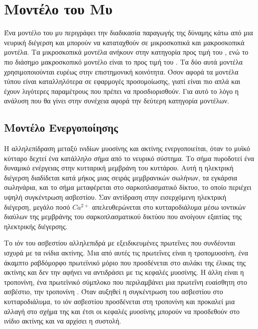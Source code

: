 \section{Μοντέλο του Μυ}

Ένα μοντέλο του μυ περιγράφει την διαδικασία παραγωγής της δύναμης κάτω από μια νευρική διέγερση και μπορούν να καταταχθούν σε μικροσκοπικά και μακροσκοπικά μοντέλα. Τα μικροσκοπικά μοντέλα ανήκουν στην κατηγορία  προς τιμή του , ενώ το πιο διάσημο μακροσκοπικό μοντέλο είναι το  προς τιμή του . Τα δύο αυτά μοντέλα χρησιμοποιούνται ευρέως στην επιστημονική κοινότητα. Όσον αφορά τα μοντέλα τύπου  είναι καταλληλότερα σε εφαρμογές προσομοίωσης, γιατί είναι πιο απλά και έχουν λιγότερες παραμέτρους που πρέπει να προσδιορισθούν. Για αυτό το λόγο η ανάλυση που θα γίνει στην συνέχεια αφορά την δεύτερη κατηγορία μοντέλων.

\subsection{Μοντέλο Ενεργοποίησης}

Η αλληλεπίδραση μεταξύ ινιδίων μυοσίνης και ακτίνης ενεργοποιείται, όταν το μυϊκό κύτταρο δεχτεί ένα κατάλληλο σήμα από το νευρικό σύστημα. Το σήμα πυροδοτεί ένα δυναμικό ενέργειας στην κυτταρική μεμβράνη του κυττάρου. Αυτή η ηλεκτρική διέγερση διαδίδεται κατά μήκος μιας σειράς μεμβρανικών σωλήνων, τα εγκάρσια σωληνάρια, και το σήμα μεταφέρεται στο σαρκοπλασματικό δίκτυο, το οποίο περιέχει υψηλή συγκέντρωση ασβεστίου. Σαν αντίδραση στην εισερχόμενη ηλεκτρική διέγερση, μεγάλο ποσό $Ca^{2+}$ απελευθερώνεται στο κυτταροδιάλυμα μέσω ιοντικών διαύλων της μεμβράνης του σαρκοπλασματικού δικτύου που ανοίγουν εξαιτίας της ηλεκτρικής διέγερσης.

Το ιόν του ασβεστίου αλληλεπιδρά με εξειδικευμένες πρωτεΐνες που συνδέονται ισχυρά με τα ινίδια ακτίνης. Μια από αυτές τις πρωτεΐνες είναι η τροπομυοσίνη, ένα άκαμπτο ραβδόμορφο πρωτεϊνικό μόριο που προσδένεται στο αυλάκι της έλικας της ακτίνης και δεν την αφήνει να αντιδράσει με τις κεφαλές μυοσίνης. Η άλλη είναι η τροπονίνη, ένα πρωτεϊνικό σύμπλοκο που περιλαμβάνει μια πρωτεΐνη ευαίσθητη στο ασβέστιο, την τροπονίνη . Όταν αυξηθεί η συγκέντρωση του ασβεστίου στο κυτταροδιάλυμα, το ιόν ασβεστίου προσδένεται στη τροπονίνη και προκαλεί μια αλλαγή στο σχήμα της και έτσι οι κεφαλές μυοσίνης μπορούν να προσδεθούν στο ινίδιο ακτίνης και να αρχίσει η συστολή.


